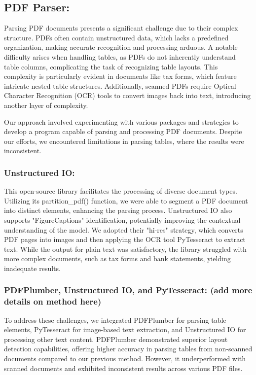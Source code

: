 \documentclass{scrartcl}
\begin{document}
\subsection {PDF Parser:}
Parsing PDF documents presents a significant challenge due to their complex structure. PDFs often contain unstructured data, which lacks a predefined organization, making accurate recognition and processing arduous. A notable difficulty arises when handling tables, as PDFs do not inherently understand table columns, complicating the task of recognizing table layouts. This complexity is particularly evident in documents like tax forms, which feature intricate nested table structures. Additionally, scanned PDFs require Optical Character Recognition (OCR) tools to convert images back into text, introducing another layer of complexity.

Our approach involved experimenting with various packages and strategies to develop a program capable of parsing and processing PDF documents. Despite our efforts, we encountered limitations in parsing tables, where the results were inconsistent.
\subsubsection{Unstructured IO:} 
This open-source library facilitates the processing of diverse document types. Utilizing its partition_pdf() function, we were able to segment a PDF document into distinct elements, enhancing the parsing process. Unstructured IO also supports "FigureCaptions" identification, potentially improving the contextual understanding of the model. We adopted their "hi-res" strategy, which converts PDF pages into images and then applying the OCR tool PyTesseract to extract text. 
While the output for plain text was satisfactory, the library struggled with more complex documents, such as tax forms and bank statements, yielding inadequate results.

\subsubsection{PDFPlumber, Unstructured IO, and PyTesseract: (add more details on method here)}
To address these challenges, we integrated PDFPlumber for parsing table elements, PyTesseract for image-based text extraction, and Unstructured IO for processing other text content. PDFPlumber demonstrated superior layout detection capabilities, offering higher accuracy in parsing tables from non-scanned documents compared to our previous method. However, it underperformed with scanned documents and exhibited inconsistent results across various PDF files.
\end{document}
